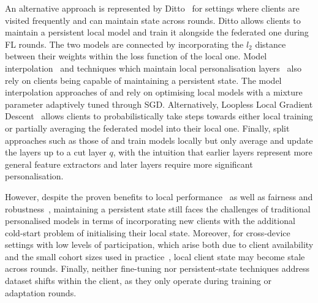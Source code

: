 An alternative approach is represented by Ditto~\citep{Ditto} for settings where clients are visited frequently and can maintain state across rounds. Ditto allows clients to maintain a persistent local model and train it alongside the federated one during FL rounds. The two models are connected by incorporating the $l_2$ distance between their weights within the loss function of the local one.  Model interpolation~\citep{ThreeApproachesMansour,AdaptivePersonalisedFederatedLearning,FederatedLearningMixtureOfGlobalAndLocal} and techniques which maintain local personalisation layers~\citep{FlWithPersonalisationLayers,FedSplitBert} also rely on clients being capable of maintaining a persistent state. The model interpolation approaches of \citet{ThreeApproachesMansour} and \citet{AdaptivePersonalisedFederatedLearning} rely on optimising local models with a mixture parameter adaptively tuned through SGD. Alternatively, Loopless Local Gradient Descent~\citep{FederatedLearningMixtureOfGlobalAndLocal} allows clients to probabilistically take steps towards either local training or partially averaging the federated model into their local one. Finally, split approaches such as those of \citet{FlWithPersonalisationLayers} and \citet{FedSplitBert} train models locally but only average and update the layers up to a cut layer $q$, with the intuition that earlier layers represent more general feature extractors and later layers require more significant personalisation.

However, despite the proven benefits to local performance~\citep{FlWithPersonalisationLayers,AdaptivePersonalisedFederatedLearning} as well as fairness and robustness~\citep{Ditto}, maintaining a persistent state still faces the challenges of traditional personalised models in terms of incorporating new clients with the additional cold-start problem of initialising their local state. Moreover, for cross-device settings with low levels of participation, which arise both due to client availability and the small cohort sizes used in practice~\citep{ScaleSystemDesign,LargeCohorts}, local client state may become stale across rounds. Finally, neither fine-tuning nor persistent-state techniques address dataset shifts within the client, as they only operate during training or adaptation rounds.

